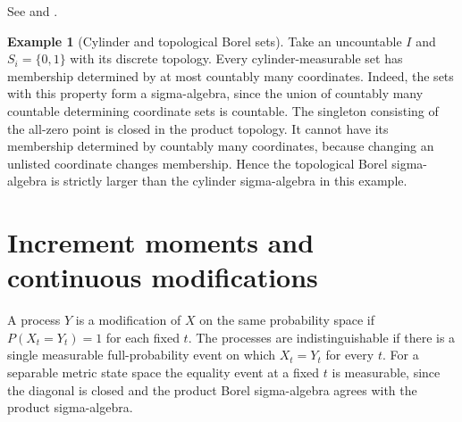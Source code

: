 \documentclass[11pt,oneside,openany]{book}
\theoremstyle{plain}
\theoremstyle{definition}
\newtheorem{example}[theorem]{Example}
\theoremstyle{remark}
\begin{document}
See \cite[Lemma 4.1, Proposition 4.2, and Corollary 8.25, pp.~83--84 and 181]{Kallenberg} and \cite[Example A.3.2, p.~464]{Durrett}.

\begin{example}[Cylinder and topological Borel sets]\label{ex:uncountable-cylinder}
Take an uncountable \(I\) and \(S_i=\{0,1\}\) with its discrete topology. Every cylinder-measurable set has membership determined by at most countably many coordinates. Indeed, the sets with this property form a sigma-algebra, since the union of countably many countable determining coordinate sets is countable. The singleton consisting of the all-zero point is closed in the product topology. It cannot have its membership determined by countably many coordinates, because changing an unlisted coordinate changes membership. Hence the topological Borel sigma-algebra is strictly larger than the cylinder sigma-algebra in this example.
\end{example}

\section{Increment moments and continuous modifications}\label{p05-04}

A process \(Y\) is a modification of \(X\) on the same probability space if \(P(X_t=Y_t)=1\) for each fixed \(t\). The processes are indistinguishable if there is a single measurable full-probability event on which \(X_t=Y_t\) for every \(t\). For a separable metric state space the equality event at a fixed \(t\) is measurable, since the diagonal is closed and the product Borel sigma-algebra agrees with the product sigma-algebra.
\end{document}
